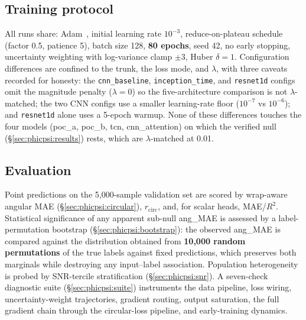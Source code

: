 \subsection{Training protocol}
\label{sec:phicpsi:protocol}

All runs share: Adam~\citep{kingma2015adam}, initial learning rate $10^{-3}$, reduce-on-plateau schedule (factor 0.5, patience 5), batch size 128, \textbf{80 epochs}, seed 42, no early stopping, uncertainty weighting with log-variance clamp $\pm 3$, Huber $\delta = 1$.
Configuration differences are confined to the trunk, the loss mode, and $\lambda$, with three caveats recorded for honesty: the \texttt{cnn\_baseline}, \texttt{inception\_time}, and \texttt{resnet1d} configs omit the magnitude penalty ($\lambda = 0$) so the five-architecture comparison is not $\lambda$-matched; the two CNN configs use a smaller learning-rate floor ($10^{-7}$ vs $10^{-6}$); and \texttt{resnet1d} alone uses a 5-epoch warmup.
None of these differences touches the four models (poc\_a, poc\_b, tcn, cnn\_attention) on which the verified null (\S\ref{sec:phicpsi:results}) rests, which are $\lambda$-matched at 0.01.

\subsection{Evaluation}
\label{sec:phicpsi:evaluation}

Point predictions on the 5{,}000-sample validation set are scored by wrap-aware angular MAE (\S\ref{sec:phicpsi:circular}), $r_{\mathrm{circ}}$, and, for scalar heads, MAE/$R^2$.
Statistical significance of any apparent sub-null ang\_MAE is assessed by a label-permutation bootstrap (\S\ref{sec:phicpsi:bootstrap}): the observed ang\_MAE is compared against the distribution obtained from \textbf{10{,}000 random permutations} of the true labels against fixed predictions, which preserves both marginals while destroying any input--label association.
Population heterogeneity is probed by SNR-tercile stratification (\S\ref{sec:phicpsi:snr}).
A seven-check diagnostic suite (\S\ref{sec:phicpsi:suite}) instruments the data pipeline, loss wiring, uncertainty-weight trajectories, gradient routing, output saturation, the full gradient chain through the circular-loss pipeline, and early-training dynamics.